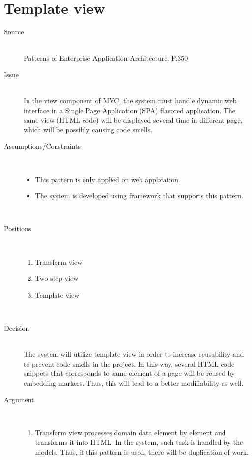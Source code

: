 \section{Template view}
\begin{description}
\item [Source]~\\
Patterns of Enterprise Application Architecture, P.350 \cite{Fowler:2002:PEA:579257}

\item [Issue]~\\
In the view component of MVC, the system must handle dynamic web interface in a Single Page Application (SPA) flavored application. The same view (HTML code) will be displayed several time in different page, which will be possibly causing code smells.

\item [Assumptions/Constraints]~
\begin{itemize}
\item This pattern is only applied on web application.
\item The system is developed using framework that supports this pattern.
\end{itemize}
~\\[-1.5cm]

\item [Positions]~
\begin{enumerate}
\item Transform view
\item Two step view
\item Template view
\end{enumerate}
~\\[-1.5cm]

\item [Decision] ~\\
The system will utilize template view in order to increase reusability and to prevent code smells in the project. In this way, several HTML code snippets that corresponds to same element of a page will be reused by embedding markers. Thus, this will lead to a better modifiability as well.

\item [Argument]~
\begin{enumerate}
\item Transform view processes domain data element by element and transforms it into HTML. In the system, such task is handled by the models. Thus, if this pattern is used, there will be duplication of work.


\end{enumerate}
\end{description}
